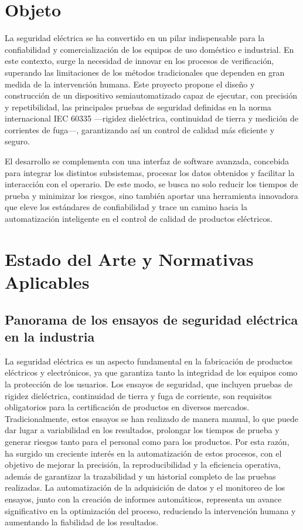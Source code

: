 \documentclass[a4paper,12pt]{article}
\begin{document}
\section{Objeto}
La seguridad eléctrica se ha convertido en un pilar indispensable para la confiabilidad y comercialización de los equipos de uso doméstico e industrial. En este contexto, surge la necesidad de innovar en los procesos de verificación, superando las limitaciones de los métodos tradicionales que dependen en gran medida de la intervención humana. Este proyecto propone el diseño y construcción de un dispositivo semiautomatizado capaz de ejecutar, con precisión y repetibilidad, las principales pruebas de seguridad definidas en la norma internacional IEC 60335 ---rigidez dieléctrica, continuidad de tierra y medición de corrientes de fuga---, garantizando así un control de calidad más eficiente y seguro.

\vspace{0.3cm}\noindent El desarrollo se complementa con una interfaz de software avanzada, concebida para integrar los distintos subsistemas, procesar los datos obtenidos y facilitar la interacción con el operario. De este modo, se busca no solo reducir los tiempos de prueba y minimizar los riesgos, sino también aportar una herramienta innovadora que eleve los estándares de confiabilidad y trace un camino hacia la automatización inteligente en el control de calidad de productos eléctricos.

\section{Estado del Arte y Normativas Aplicables}
\subsection{Panorama de los ensayos de seguridad eléctrica en la industria}
La seguridad eléctrica es un aspecto fundamental en la fabricación de productos eléctricos y electrónicos, ya que garantiza tanto la integridad de los equipos como la protección de los usuarios. Los ensayos de seguridad, que incluyen pruebas de rigidez dieléctrica, continuidad de tierra y fuga de corriente, son requisitos obligatorios para la certificación de productos en diversos mercados. Tradicionalmente, estos ensayos se han realizado de manera manual, lo que puede dar lugar a variabilidad en los resultados, prolongar los tiempos de prueba y generar riesgos tanto para el personal como para los productos. Por esta razón, ha surgido un creciente interés en la automatización de estos procesos, con el objetivo de mejorar la precisión, la reproducibilidad y la eficiencia operativa, además de garantizar la trazabilidad y un historial completo de las pruebas realizadas. La automatización de la adquisición de datos y el monitoreo de los ensayos, junto con la creación de informes automáticos, representa un avance significativo en la optimización del proceso, reduciendo la intervención humana y aumentando la fiabilidad de los resultados.
\end{document}
